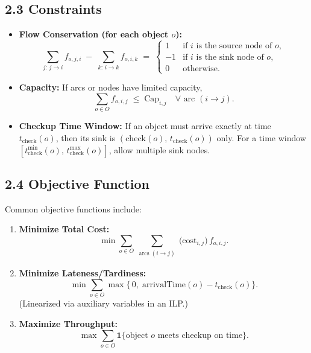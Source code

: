 \subsection*{2.3 Constraints}

\begin{itemize}
  \item \textbf{Flow Conservation (for each object $o$):}
  \[
    \sum_{j:\, j \to i} f_{o,j,i} \;-\; \sum_{k:\, i \to k} f_{o,i,k}
    \;=\;
    \begin{cases}
      1 & \text{if $i$ is the source node of $o$},\\
      -1 & \text{if $i$ is the sink node of $o$},\\
      0 & \text{otherwise}.
    \end{cases}
  \]

  \item \textbf{Capacity:} If arcs or nodes have limited capacity,
  \[
    \sum_{o \in O} f_{o,i,j} \;\le\; \mathrm{Cap}_{i,j}
    \quad \forall \text{ arc }(i \to j).
  \]

  \item \textbf{Checkup Time Window:} If an object must arrive exactly at time $t_{\mathrm{check}}(o)$, then its sink is $(\mathrm{check}(o),\, t_{\mathrm{check}}(o))$ only. For a time window $[t_{\mathrm{check}}^{\min}(o),\, t_{\mathrm{check}}^{\max}(o)]$, allow multiple sink nodes.
\end{itemize}

\subsection*{2.4 Objective Function}

Common objective functions include:

\begin{enumerate}
  \item \textbf{Minimize Total Cost:}
  \[
    \min \sum_{o \in O} \sum_{\substack{\text{arcs }(i \to j)}} 
      \bigl(\mathrm{cost}_{i,j}\bigr)\, f_{o,i,j}.
  \]

  \item \textbf{Minimize Lateness/Tardiness:} 
  \[
    \min \sum_{o \in O} \max\{\,0,\; \mathrm{arrivalTime}(o) - t_{\mathrm{check}}(o)\}.
  \]
  (Linearized via auxiliary variables in an ILP.)

  \item \textbf{Maximize Throughput:} 
  \[
    \max \sum_{o \in O} \mathbf{1}\{\text{object $o$ meets checkup on time}\}.
  \]
\end{enumerate}

